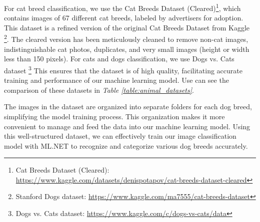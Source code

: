 For cat breed classification, we use the Cat Breeds Dataset (Cleared)\footnote{Cat Breeds Dataset (Cleared): \url{https://www.kaggle.com/datasets/denispotapov/cat-breeds-dataset-cleared}}, which contains images of 67 different cat breeds, labeled by advertisers for
adoption. This dataset is a refined version of the original Cat Breeds Dataset from Kaggle \footnote{Stanford Dogs dataset: \url{https://www.kaggle.com/ma7555/cat-breeds-dataset}}.
The cleared version has been meticulously cleaned to remove non-cat images, indistinguishable cat photos, duplicates, and very small images
(height or width less than 150 pixels). For cats and dogs classification, we use Dogs vs. Cats dataset \footnote{Dogs vs. Cats dataset: \url{https://www.kaggle.com/c/dogs-vs-cats/data}} This ensures that the dataset is of high quality, facilitating accurate training and performance of our
machine learning model. Use can see the comparison of these datasets in \emph{Table \ref{table:animal_datasets}}.



The images in the dataset are organized into separate folders for each dog breed, simplifying the model training process. This organization
makes it more convenient to manage and feed the data into our machine learning model. Using this well-structured dataset, we can effectively
train our image classification model with ML.NET to recognize and categorize various dog breeds accurately.

